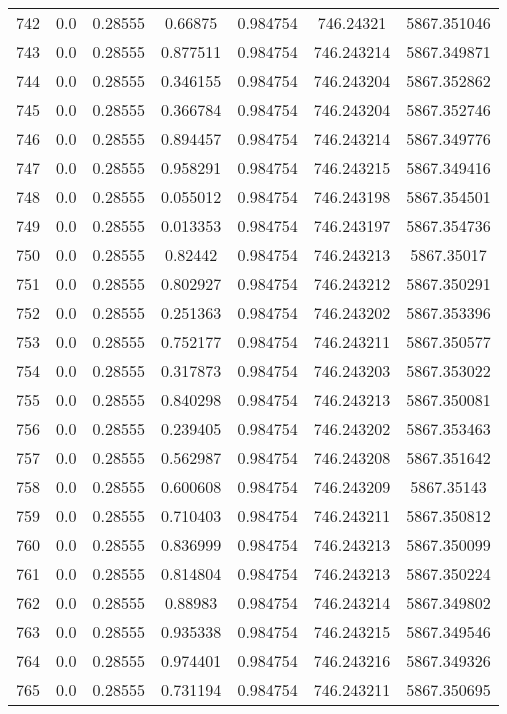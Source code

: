 \begin{table}
\begin{tabular*}{\linewidth}{c|c|c|c|c|c|c}
742 & 0.0 & 0.28555 & 0.66875 & 0.984754 & 746.24321 & 5867.351046\\
743 & 0.0 & 0.28555 & 0.877511 & 0.984754 & 746.243214 & 5867.349871\\
744 & 0.0 & 0.28555 & 0.346155 & 0.984754 & 746.243204 & 5867.352862\\
745 & 0.0 & 0.28555 & 0.366784 & 0.984754 & 746.243204 & 5867.352746\\
746 & 0.0 & 0.28555 & 0.894457 & 0.984754 & 746.243214 & 5867.349776\\
747 & 0.0 & 0.28555 & 0.958291 & 0.984754 & 746.243215 & 5867.349416\\
748 & 0.0 & 0.28555 & 0.055012 & 0.984754 & 746.243198 & 5867.354501\\
749 & 0.0 & 0.28555 & 0.013353 & 0.984754 & 746.243197 & 5867.354736\\
750 & 0.0 & 0.28555 & 0.82442 & 0.984754 & 746.243213 & 5867.35017\\
751 & 0.0 & 0.28555 & 0.802927 & 0.984754 & 746.243212 & 5867.350291\\
752 & 0.0 & 0.28555 & 0.251363 & 0.984754 & 746.243202 & 5867.353396\\
753 & 0.0 & 0.28555 & 0.752177 & 0.984754 & 746.243211 & 5867.350577\\
754 & 0.0 & 0.28555 & 0.317873 & 0.984754 & 746.243203 & 5867.353022\\
755 & 0.0 & 0.28555 & 0.840298 & 0.984754 & 746.243213 & 5867.350081\\
756 & 0.0 & 0.28555 & 0.239405 & 0.984754 & 746.243202 & 5867.353463\\
757 & 0.0 & 0.28555 & 0.562987 & 0.984754 & 746.243208 & 5867.351642\\
758 & 0.0 & 0.28555 & 0.600608 & 0.984754 & 746.243209 & 5867.35143\\
759 & 0.0 & 0.28555 & 0.710403 & 0.984754 & 746.243211 & 5867.350812\\
760 & 0.0 & 0.28555 & 0.836999 & 0.984754 & 746.243213 & 5867.350099\\
761 & 0.0 & 0.28555 & 0.814804 & 0.984754 & 746.243213 & 5867.350224\\
762 & 0.0 & 0.28555 & 0.88983 & 0.984754 & 746.243214 & 5867.349802\\
763 & 0.0 & 0.28555 & 0.935338 & 0.984754 & 746.243215 & 5867.349546\\
764 & 0.0 & 0.28555 & 0.974401 & 0.984754 & 746.243216 & 5867.349326\\
765 & 0.0 & 0.28555 & 0.731194 & 0.984754 & 746.243211 & 5867.350695\\
\end{tabular*}
\end{table}
